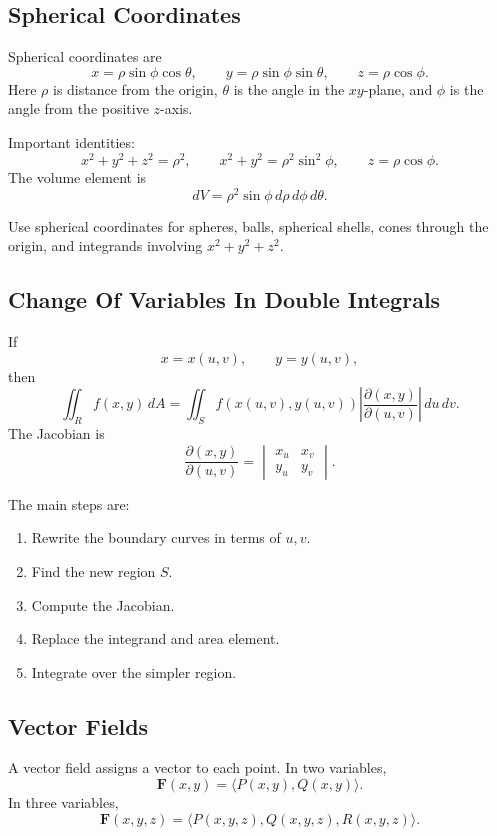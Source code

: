 \documentclass[11pt]{article}
\begin{document}
\subsection{Spherical Coordinates}

Spherical coordinates are
\[
x=\rho\sin\phi\cos\theta,\qquad
y=\rho\sin\phi\sin\theta,\qquad
z=\rho\cos\phi.
\]
Here $\rho$ is distance from the origin, $\theta$ is the angle in the $xy$-plane, and $\phi$ is the angle from the positive $z$-axis.

Important identities:
\[
x^2+y^2+z^2=\rho^2,\qquad x^2+y^2=\rho^2\sin^2\phi,\qquad z=\rho\cos\phi.
\]
The volume element is
\[
dV=\rho^2\sin\phi\,d\rho\,d\phi\,d\theta.
\]

Use spherical coordinates for spheres, balls, spherical shells, cones through the origin, and integrands involving $x^2+y^2+z^2$.

\subsection{Change Of Variables In Double Integrals}

If
\[
x=x(u,v),\qquad y=y(u,v),
\]
then
\[
\iint_R f(x,y)\,dA
=\iint_S f(x(u,v),y(u,v))
\left|\frac{\partial(x,y)}{\partial(u,v)}\right|\,du\,dv.
\]
The Jacobian is
\[
\frac{\partial(x,y)}{\partial(u,v)}
=
\begin{vmatrix}
x_u & x_v\\
y_u & y_v
\end{vmatrix}.
\]

The main steps are:
\begin{enumerate}
\item Rewrite the boundary curves in terms of $u,v$.
\item Find the new region $S$.
\item Compute the Jacobian.
\item Replace the integrand and area element.
\item Integrate over the simpler region.
\end{enumerate}

\subsection{Vector Fields}

A vector field assigns a vector to each point. In two variables,
\[
\mathbf F(x,y)=\langle P(x,y),Q(x,y)\rangle.
\]
In three variables,
\[
\mathbf F(x,y,z)=\langle P(x,y,z),Q(x,y,z),R(x,y,z)\rangle.
\]
\end{document}
